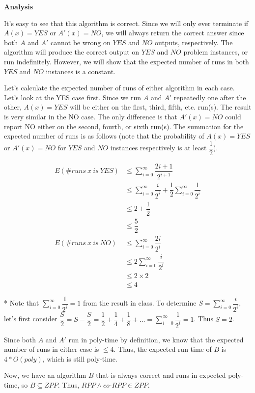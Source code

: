 \documentclass{article}
\begin{document}
\textbf{Analysis}

It's easy to see that this algorithm is correct. Since we will only ever terminate if $A(x) = YES$ or $A'(x) = NO$, we
will always return the correct answer since both $A$ and $A'$ cannot be wrong on $YES$ and $NO$ outputs,
respectively. The algorithm will produce the correct output on $YES$ and $NO$ problem instances, or run indefinitely.
However, we will show that the expected number of runs in both $YES$ and $NO$ instances is a constant.

Let's calculate the expected number of runs of either algorithm in each case. Let's look at the YES case first. Since we
run $A$ and $A'$ repeatedly one after the other, $A(x) = YES$ will be either on the first, third, fifth, etc. run(s).
The result is very similar in the NO case.  The only difference is that $A'(x) = NO$ could report NO either on the
second, fourth, or sixth run(s).  The summation for the expected number of runs is as follows (note that the probability
of $A(x) = YES$ or $A'(x) = NO$ for $YES$ and $NO$ instances respectively is at least $\dfrac{1}{2}$).


\begin{align*}
    E(\# runs \: x \: is \: YES) &\leq \sum_{i=0}^{\infty} \dfrac{2i + 1}{2^{i+1}} \\
                      &\leq \sum_{i=0}^{\infty} \dfrac{i}{2^{i}} + \dfrac{1}{2} \sum_{i=0}^{\infty} \dfrac{1}{2^{i}} \\
                      &\leq 2 + \dfrac{1}{2} \\
                      &\leq \dfrac{5}{2} \\
    E(\# runs \: x \: is \: NO)  &\leq \sum_{i=0}^{\infty} \dfrac{2i}{2^{i}} \\
                      &\leq 2 \sum_{i=0}^{\infty} \dfrac{i}{2^{i}} \\
                      &\leq 2 \times 2 \\
                      &\leq 4
\end{align*}

* Note that $\sum_{i=0}^{\infty} \dfrac{1}{2^i} = 1$ from the result in class. To determine $S = \sum_{i=0}^{\infty}
\dfrac{i}{2^i}$, let's first consider $\dfrac{S}{2} = S - \dfrac{S}{2} = \dfrac{1}{2} + \dfrac{1}{4} + \dfrac{1}{8} +
\ldots = \sum_{i=0}^{\infty} \dfrac{1}{2^i} = 1$. Thus $S = 2$.

Since both $A$ and $A'$ run in poly-time by definition, we know that the expected number of runs in either case is $\leq
4$. Thus, the expected run time of $B$ is $4 * O(poly)$, which is still poly-time.

Now, we have an algorithm $B$ that is always correct and runs in expected poly-time, so $B \subseteq ZPP$. Thus, $RPP
\land co$-$RPP \in ZPP$.
\end{document}
